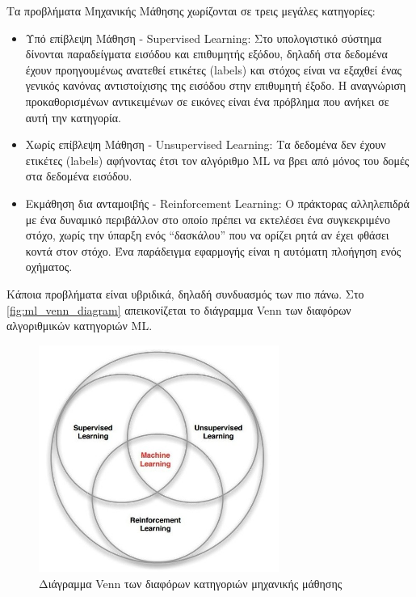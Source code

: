 Τα προβλήματα Μηχανικής Μάθησης χωρίζονται σε τρεις μεγάλες κατηγορίες:
\begin{itemize}
  \item{Υπό επίβλεψη Μάθηση - Supervised Learning:
      Στο υπολογιστικό σύστημα δίνονται παραδείγματα εισόδου και επιθυμητής εξόδου,
      δηλαδή στα δεδομένα έχουν προηγουμένως ανατεθεί ετικέτες (labels)
      και στόχος είναι να εξαχθεί ένας γενικός κανόνας αντιστοίχισης της εισόδου στην επιθυμητή έξοδο.
      Η αναγνώριση προκαθορισμένων αντικειμένων σε εικόνες είναι ένα πρόβλημα που ανήκει 
      σε αυτή την κατηγορία.
    }
  \item{Χωρίς επίβλεψη Μάθηση - Unsupervised Learning:
      Τα δεδομένα δεν έχουν ετικέτες (labels) αφήνοντας έτσι τον αλγόριθμο ML να βρει
      από μόνος του δομές στα δεδομένα εισόδου.
    }
  \item{Εκμάθηση δια ανταμοιβής - Reinforcement Learning:
      Ο πράκτορας αλληλεπιδρά με ένα δυναμικό περιβάλλον στο οποίο πρέπει να
      εκτελέσει ένα συγκεκριμένο στόχο, χωρίς την ύπαρξη ενός “δασκάλου” που να
      ορίζει ρητά αν έχει φθάσει κοντά στον στόχο. Ένα παράδειγμα εφαρμογής
      είναι η αυτόματη πλοήγηση ενός οχήματος.
    }
\end{itemize}
Kάποια προβλήματα είναι υβριδικά, δηλαδή συνδυασμός των πιο πάνω.
Στο \autoref{fig:ml_venn_diagram} απεικονίζεται το διάγραμμα Venn των διαφόρων 
αλγοριθμικών κατηγοριών ML.
\begin{figure}[!ht]
  \centering
  \includegraphics[width=0.7\textwidth]{./images/chapter3/ml_venn_diagram.jpg}
  \caption[Διάγραμμα Venn των διαφόρων κατηγοριών μηχανικής μάθησης]{Διάγραμμα Venn των διαφόρων κατηγοριών μηχανικής μάθησης}
  \label{fig:ml_venn_diagram}
\end{figure}

